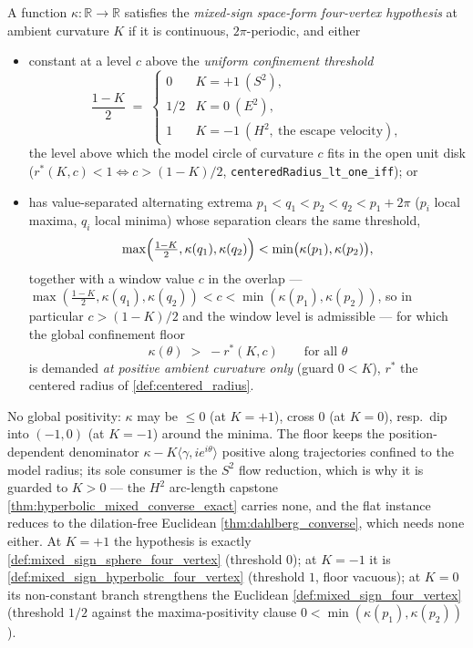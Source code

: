 \begin{definition}
  \label{def:mixed_sign_spaceform_four_vertex}
  A function $\kappa:\mathbb R\to\mathbb R$ satisfies the \emph{mixed-sign
  space-form four-vertex hypothesis} at ambient curvature $K$ if it is
  continuous, $2\pi$-periodic, and either
  \begin{itemize}
  \item constant at a level $c$ above the \emph{uniform confinement threshold}
    \[
      \frac{1-K}{2}\;=\;
      \begin{cases}
        0 & K=+1\ (S^2),\\
        1/2 & K=0\ (E^2),\\
        1 & K=-1\ (H^2,\ \text{the escape velocity}),
      \end{cases}
    \]
    the level above which the model circle of curvature $c$ fits in the open
    unit disk ($r^\ast(K,c)<1\iff c>(1-K)/2$,
    \texttt{centeredRadius\_lt\_one\_iff}); or
  \item has value-separated alternating extrema
    $p_1<q_1<p_2<q_2<p_1+2\pi$ ($p_i$ local maxima, $q_i$ local minima) whose
    separation clears the same threshold,
    \[
      \max\Bigl(\tfrac{1-K}{2},\kappa(q_1),\kappa(q_2)\Bigr)
      <\min\bigl(\kappa(p_1),\kappa(p_2)\bigr),
    \]
    together with a window value $c$ in the overlap —
    $\max(\tfrac{1-K}{2},\kappa(q_1),\kappa(q_2))<c<
    \min(\kappa(p_1),\kappa(p_2))$, so in particular $c>(1-K)/2$ and
    the window level is admissible — for which the global confinement floor
    \[
      \kappa(\theta)\;>\;-r^\ast(K,c)
      \qquad\text{for all }\theta
    \]
    is demanded \emph{at positive ambient curvature only} (guard $0<K$),
    $r^\ast$ the centered radius of \cref{def:centered_radius}.
  \end{itemize}
  No global positivity: $\kappa$ may be $\le0$ (at $K=+1$), cross $0$
  (at $K=0$), resp.\ dip into $(-1,0)$ (at $K=-1$) around
  the minima. The floor keeps the position-dependent denominator
  $\kappa-K\langle \gamma,ie^{i\theta}\rangle$ positive along trajectories
  confined to the model radius; its sole consumer is the $S^2$ flow reduction,
  which is why it is guarded to $K>0$ — the $H^2$ arc-length capstone
  \cref{thm:hyperbolic_mixed_converse_exact} carries none, and the flat
  instance reduces to the dilation-free Euclidean
  \cref{thm:dahlberg_converse}, which needs none either. At $K=+1$
  the hypothesis is exactly \cref{def:mixed_sign_sphere_four_vertex}
  (threshold $0$); at $K=-1$ it is
  \cref{def:mixed_sign_hyperbolic_four_vertex} (threshold $1$, floor vacuous);
  at $K=0$ its non-constant branch strengthens the Euclidean
  \cref{def:mixed_sign_four_vertex} (threshold $1/2$ against the
  maxima-positivity clause $0<\min(\kappa(p_1),\kappa(p_2))$).
\end{definition}

